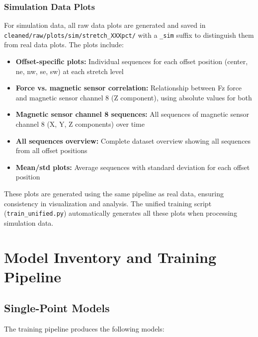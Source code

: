 \documentclass[11pt,a4paper]{article}
\begin{document}
\subsubsection{Simulation Data Plots}
For simulation data, all raw data plots are generated and saved in \texttt{cleaned/raw/plots/sim/stretch\_XXXpct/} with a \texttt{\_sim} suffix to distinguish them from real data plots. The plots include:
\begin{itemize}[leftmargin=1.5em]
    \item \textbf{Offset-specific plots:} Individual sequences for each offset position (center, ne, nw, se, sw) at each stretch level
    \item \textbf{Force vs. magnetic sensor correlation:} Relationship between Fz force and magnetic sensor channel 8 (Z component), using absolute values for both
    \item \textbf{Magnetic sensor channel 8 sequences:} All sequences of magnetic sensor channel 8 (X, Y, Z components) over time
    \item \textbf{All sequences overview:} Complete dataset overview showing all sequences from all offset positions
    \item \textbf{Mean/std plots:} Average sequences with standard deviation for each offset position
\end{itemize}
These plots are generated using the same pipeline as real data, ensuring consistency in visualization and analysis. The unified training script (\texttt{train\_unified.py}) automatically generates all these plots when processing simulation data.

\section{Model Inventory and Training Pipeline}
\subsection{Single-Point Models}
The training pipeline produces the following models:
\end{document}
